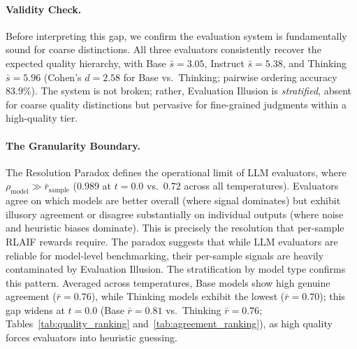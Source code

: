 \documentclass{article}
\begin{document}
\paragraph{Validity Check.} Before interpreting this gap, we confirm the evaluation system is fundamentally sound for coarse distinctions. All three evaluators consistently recover the expected quality hierarchy, with Base $\bar{s} = 3.05$, Instruct $\bar{s} = 5.38$, and Thinking $\bar{s} = 5.96$ (Cohen's $d = 2.58$ for Base vs.\ Thinking; pairwise ordering accuracy 83.9\%). The system is not broken; rather, Evaluation Illusion is \textit{stratified}, absent for coarse quality distinctions but pervasive for fine-grained judgments within a high-quality tier.

\paragraph{The Granularity Boundary.} The Resolution Paradox defines the operational limit of LLM evaluators, where $\rho_{\text{model}} \gg \bar{r}_{\text{sample}}$ ($0.989$ at $t{=}0.0$ vs.\ $0.72$ across all temperatures). Evaluators agree on which models are better overall (where signal dominates) but exhibit illusory agreement or disagree substantially on individual outputs (where noise and heuristic biases dominate). This is precisely the resolution that per-sample RLAIF rewards require. The paradox suggests that while LLM evaluators are reliable for model-level benchmarking, their per-sample signals are heavily contaminated by Evaluation Illusion. The stratification by model type confirms this pattern. Averaged across temperatures, Base models show high genuine agreement ($\bar{r} = 0.76$), while Thinking models exhibit the lowest ($\bar{r} = 0.70$); this gap widens at $t{=}0.0$ (Base $\bar{r} = 0.81$ vs.\ Thinking $\bar{r} = 0.76$; Tables~\ref{tab:quality_ranking} and~\ref{tab:agreement_ranking}), as high quality forces evaluators into heuristic guessing.
\end{document}
